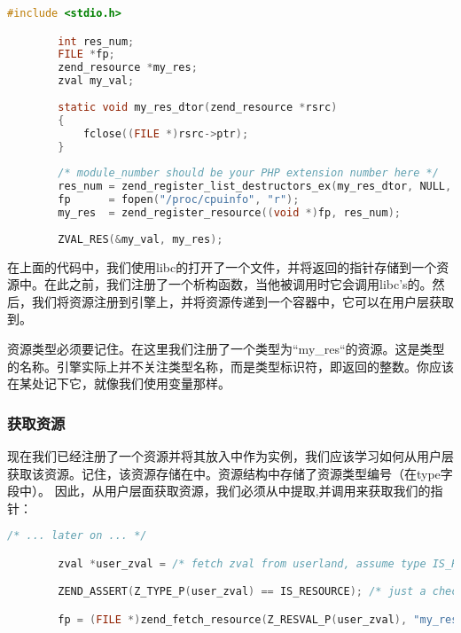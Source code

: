 \begin{lstlisting}[language=c]
        #include <stdio.h>

        int res_num;
        FILE *fp;
        zend_resource *my_res;
        zval my_val;
        
        static void my_res_dtor(zend_resource *rsrc)
        {
            fclose((FILE *)rsrc->ptr);
        }
        
        /* module_number should be your PHP extension number here */
        res_num = zend_register_list_destructors_ex(my_res_dtor, NULL, "my_res", module_number);
        fp      = fopen("/proc/cpuinfo", "r");
        my_res  = zend_register_resource((void *)fp, res_num);
        
        ZVAL_RES(&my_val, my_res); 
\end{lstlisting}

在上面的代码中，我们使用libc的打开了一个文件，并将返回的指针存储到一个资源中。在此之前，我们注册了一个析构函数，当他被调用时它会调用libc's的。然后，我们将资源注册到引擎上，并将资源传递到一个容器中，它可以在用户层获取到。


资源类型必须要记住。在这里我们注册了一个类型为“my\_res“的资源。这是类型的名称。引擎实际上并不关注类型名称，而是类型标识符，即返回的整数。你应该在某处记下它，就像我们使用变量那样。

\subsubsection{获取资源}
现在我们已经注册了一个资源并将其放入中作为实例，我们应该学习如何从用户层获取该资源。记住，该资源存储在中。资源结构中存储了资源类型编号（在type字段中）。
因此，从用户层面获取资源，我们必须从中提取,并调用来获取我们的指针：

\begin{lstlisting}[language=c]
        /* ... later on ... */

        zval *user_zval = /* fetch zval from userland, assume type IS_RESOURCE */

        ZEND_ASSERT(Z_TYPE_P(user_zval) == IS_RESOURCE); /* just a check to be sure */

        fp = (FILE *)zend_fetch_resource(Z_RESVAL_P(user_zval), "my_res", res_num);
\end{lstlisting}        

